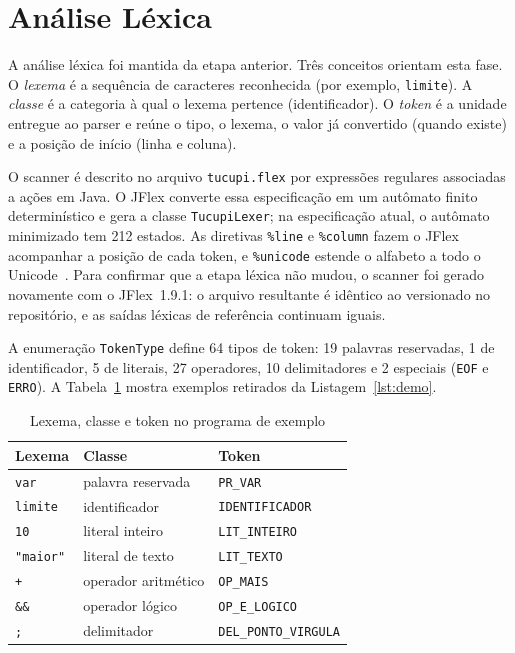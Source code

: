 \documentclass[conference,a4paper]{IEEEtran}
\newcommand{\cod}[1]{\texttt{#1}}
\begin{document}
\section{Análise Léxica}

A análise léxica foi mantida da etapa anterior. Três conceitos orientam esta fase. O \emph{lexema} é a sequência de caracteres reconhecida (por exemplo, \cod{limite}). A \emph{classe} é a categoria à qual o lexema pertence (identificador). O \emph{token} é a unidade entregue ao parser e reúne o tipo, o lexema, o valor já convertido (quando existe) e a posição de início (linha e coluna).

O scanner é descrito no arquivo \cod{tucupi.flex} por expressões regulares associadas a ações em Java. O JFlex converte essa especificação em um autômato finito determinístico e gera a classe \cod{TucupiLexer}; na especificação atual, o autômato minimizado tem 212 estados. As diretivas \cod{\%line} e \cod{\%column} fazem o JFlex acompanhar a posição de cada token, e \cod{\%unicode} estende o alfabeto a todo o Unicode~\cite{jflexmanual}. Para confirmar que a etapa léxica não mudou, o scanner foi gerado novamente com o JFlex~1.9.1: o arquivo resultante é idêntico ao versionado no repositório, e as saídas léxicas de referência continuam iguais.

A enumeração \cod{TokenType} define 64 tipos de token: 19 palavras reservadas, 1 de identificador, 5 de literais, 27 operadores, 10 delimitadores e 2 especiais (\cod{EOF} e \cod{ERRO}). A Tabela~\ref{tab:tokens} mostra exemplos retirados da Listagem~\ref{lst:demo}.

\begin{table}[t]
\caption{Lexema, classe e token no programa de exemplo}
\label{tab:tokens}
\centering
\footnotesize
\begin{tabular}{@{}lll@{}}
\toprule
Lexema & Classe & Token \\
\midrule
\cod{var} & palavra reservada & \cod{PR\_VAR} \\
\cod{limite} & identificador & \cod{IDENTIFICADOR} \\
\cod{10} & literal inteiro & \cod{LIT\_INTEIRO} \\
\cod{"maior"} & literal de texto & \cod{LIT\_TEXTO} \\
\cod{+} & operador aritmético & \cod{OP\_MAIS} \\
\cod{\&\&} & operador lógico & \cod{OP\_E\_LOGICO} \\
\cod{;} & delimitador & \cod{DEL\_PONTO\_VIRGULA} \\
\bottomrule
\end{tabular}
\end{table}
\end{document}
